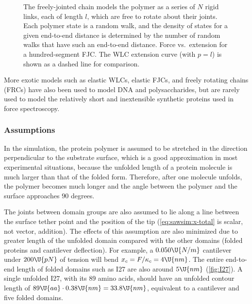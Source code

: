 \begin{figure}
  \begin{center}
    \hspace{.25in}%
    \caption{\protect{} The freely-jointed chain
      models the polymer as a series of $N$ rigid links, each of
      length $l$, which are free to rotate about their joints.  Each
      polymer state is a random walk, and the density of states for a
      given end-to-end distance is determined by the number of random
      walks that have such an end-to-end distance.
      \protect{} Force vs.~extension for a
      hundred-segment FJC.  The WLC extension curve (with $p=l$) is
      shown as a dashed line for comparison.\label{fig:fjc}}
  \end{center}
\end{figure}

More exotic models such as elastic WLCs\citep{janshoff00,puchner08},
elastic FJCs\citep{fisher99a,janshoff00}, and freely rotating
chains\citep{puchner08} (FRCs) have also been used to model DNA and
polysaccharides, but are rarely used to model the relatively short and
inextensible synthetic proteins used in force spectroscopy.
%


\subsubsection{Assumptions}
\label{sec:sawsim:tension:assumptions}

In the simulation, the protein polymer is assumed to be stretched in
the direction perpendicular to the substrate surface, which is a good
approximation in most experimental situations, because the unfolded
length of a protein molecule is much larger than that of the folded
form.  Therefore, after one molecule unfolds, the polymer becomes much
longer and the angle between the polymer and the surface approaches
$90$ degrees\citep{carrion-vazquez00}.

The joints between domain groups are also assumed to lie along a line
between the surface tether point and the position of the tip
(\cref{eq:sawsim:x-total} is scalar, not vector, addition).  The
effects of this assumption are also minimized due to greater length of
the unfolded domain compared with the other domains (folded proteins
and cantilever deflection).  For example, a $0.050\U{N/m}$ cantilever
under $200\U{pN}$ of tension will bend $x_c=F/\kappa_c=4\U{nm}$.  The
entire end-to-end length of folded domains such as I27 are also around
$5\U{nm}$ (\cref{fig:I27}).  A single unfolded I27, with its 89 amino
acids\citep{improta96}, should have an unfolded contour length of
$89\U{aa}\cdot0.38\U{nm}=33.8\U{nm}$, equivalent to a cantilever and
five folded domains.

